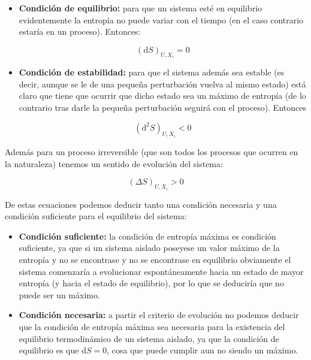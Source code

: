 \documentclass[12pt,a4paper]{article}
\newcommand{\D}{\mathrm{d}}
\begin{document}
\begin{itemize}
\item \textbf{Condición de equilibrio:} para que un sistema esté en equilibrio evidentemente la entropía no puede variar con el tiempo (en el caso contrario estaría en un proceso). Entonces:

\begin{equation}
(\D S)_{U,X_i} = 0
\end{equation}

\item \textbf{Condición de estabilidad:} para que el sistema además sea estable (es decir, aunque se le de una pequeña perturbación vuelva al mismo estado) está claro que tiene que ocurrir que dicho estado sea un máximo de entropía (de lo contrario tras darle la pequeña perturbación seguirá con el proceso). Entonces

\begin{equation}
(\D^2 S)_{U,X_i} < 0
\end{equation}

\end{itemize}

Además para un proceso irreversible (que son todos los procesos que ocurren en la naturaleza) tenemos un sentido de evolución del sistema:

\begin{equation}
(\Delta S)_{U,X_i} > 0
\end{equation}

De estas ecuaciones podemos deducir tanto una condición necesaria y una condición suficiente para el equilibrio del sistema:

\begin{itemize}
\item \textbf{Condición suficiente:} la condición de entropía máxima es condición suficiente, ya que si un sistema aislado poseyese un valor máximo de la entropía y no se encontrase y no se encontrase en equilibrio obviamente el sistema comenzaría a evolucionar espontáneamente hacia un estado de mayor entropía (y hacia el estado de equilibrio), por lo que se deduciría que no puede ser un máximo.

\item \textbf{Condición necesaria:} a partir el criterio de evolución no podemos deducir que la condición de entropía máxima sea necesaria para la existencia del equilibrio termodinámico de un sistema aislado, ya que la condición de equilibrio es que $\D S = 0$, cosa que puede cumplir aun no siendo un máximo. 
\end{itemize}
\end{document}
